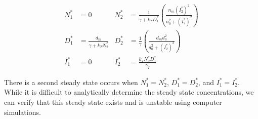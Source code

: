 \documentclass{article}
\begin{document}
\begin{flushleft}
\begin{equation}
\label{eq:two-cell-steady-states}
\begin{aligned}
  N_{1}^{*} &= 0  &
  N_{2}^{*} &= \frac{1}{\gamma + k_{T}D_{1}^{*}}\left( \frac{n_{m}(I_{2}^{*})^2}{n_{0}^2 + (I_{2}^{*})^2} \right)  \\[5pt]
  D_{1}^{*} &= \frac{d_{m}}{\gamma + k_{T}N_{2}^{*}} &
  D_{2}^{*} &= \frac{1}{\gamma} \left( \frac{d_{m}d_{0}^2}{d_{0}^2 + (I_{2}^{*})^2} \right)  \\[5pt]
  I_{1}^{*} &= 0 &
  I_{2}^{*} &= \frac{k_{T}N_{2}^{*}D_{1}^{*}}{\gamma_{I}}
\end{aligned}
\end{equation}

There is a second steady state occurs when $N_{1}^{*} = N_{2}^{*}$, $D_{1}^{*} = D_{2}^{*}$, and $I_{1}^{*} = I_{2}^{*}$. While it is difficult to analytically determine the steady state concentrations, we can verify that this steady state exists and is unstable using computer simulations.

\end{flushleft}
\end{document}
